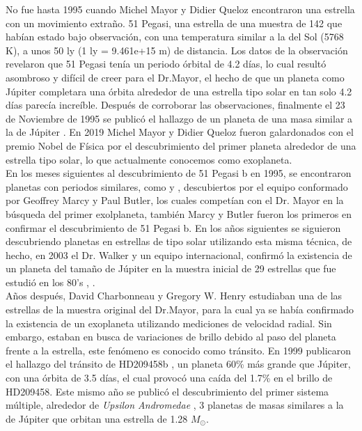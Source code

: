 No fue hasta 1995 cuando Michel Mayor y Didier Queloz encontraron una estrella con un movimiento extraño. 51 Pegasi, una estrella de una muestra de 142 que habían estado bajo observación, con una temperatura similar a la del Sol (5768 K), a unos 50 ly (1 ly = 9.461e+15 m) de distancia. Los datos de la observación revelaron que 51 Pegasi tenía un periodo órbital de 4.2 días, lo cual resultó asombroso y difícil de creer para el Dr.Mayor, el hecho de que un planeta como Júpiter completara una órbita alrededor de una estrella tipo solar en tan solo 4.2 días parecía increíble. Después de corroborar las observaciones, finalmente el 23 de Noviembre de 1995 se publicó el hallazgo de un planeta de una masa similar a la de Júpiter \cite{mayor1995jupiter}. En 2019 Michel Mayor y Didier Queloz fueron galardonados con el premio Nobel de Física por el descubrimiento del primer planeta alrededor de una estrella tipo solar, lo que actualmente conocemos como exoplaneta.\\

En los meses siguientes al descubrimiento de 51 Pegasi b en 1995, se encontraron planetas con periodos similares, como \cite{Marcy_1996} y \cite{butler1996planet}, descubiertos por el equipo conformado por Geoffrey Marcy y Paul Butler, los cuales competían con el Dr. Mayor en la búsqueda del primer exolplaneta, también Marcy y Butler fueron los primeros en confirmar el descubrimiento de 51 Pegasi b. En los años siguientes se siguieron descubriendo planetas en estrellas de tipo solar utilizando esta misma técnica, de hecho, en 2003 el Dr. Walker y un equipo internacional, confirmó la existencia de un planeta del tamaño de Júpiter en la muestra inicial de 29 estrellas que fue estudió en los 80's \cite{hatzes2003planetary}, \cite{walker2012first}.\\

Años después, David Charbonneau y Gregory W. Henry estudiaban una de las estrellas de la muestra original del Dr.Mayor, para la cual ya se había confirmado la existencia de un exoplaneta utilizando mediciones de velocidad radial. Sin embargo, estaban en busca de variaciones de brillo debido al paso del planeta frente a la estrella, este fenómeno es conocido como tránsito. En 1999 publicaron el hallazgo del tránsito de HD209458b \cite{charbonneau1999detection}, un planeta 60\% más grande que Júpiter, con una órbita de 3.5 días, el cual provocó una caída del 1.7\% en el brillo de HD209458. Este mismo año se publicó el descubrimiento del primer sistema múltiple, alrededor de \textit{Upsilon Andromedae} \cite{marcy1999three}, 3 planetas de masas similares a la de Júpiter que orbitan una estrella de 1.28 $M_{\odot}$.\\

